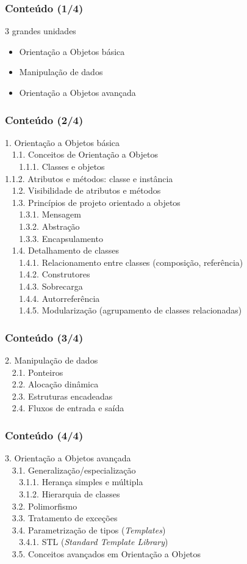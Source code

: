 \documentclass[aspectratio=169]{beamer}
\begin{document}
\begin{frame}\frametitle{Conte\'udo (1/4)}
3 grandes unidades
\begin{itemize}
	\item Orientação a Objetos básica
	\item Manipulação de dados
	\item Orientação a Objetos avançada
\end{itemize}
\end{frame}

\begin{frame}\frametitle{Conte\'udo (2/4)}
\small{1. Orientação a Objetos básica\\
~ 1.1. Conceitos de Orientação a Objetos\\
~ ~ 1.1.1. Classes e objetos\\
1.1.2. Atributos e métodos: classe e instância\\
~ 1.2. Visibilidade de atributos e métodos\\
~ 1.3. Princípios de projeto orientado a objetos\\
~ ~ 1.3.1. Mensagem\\
~ ~ 1.3.2. Abstração\\
~ ~ 1.3.3. Encapsulamento\\
~ 1.4. Detalhamento de classes\\
~ ~ 1.4.1. Relacionamento entre classes (composição, referência)\\
~ ~ 1.4.2. Construtores\\
~ ~ 1.4.3. Sobrecarga\\
~ ~ 1.4.4. Autorreferência\\
~ ~ 1.4.5. Modularização (agrupamento de classes relacionadas)}
\end{frame}

\begin{frame}\frametitle{Conte\'udo (3/4)}
2. Manipulação de dados\\
~ 2.1. Ponteiros\\
~ 2.2. Alocação dinâmica\\
~ 2.3. Estruturas encadeadas\\
~ 2.4. Fluxos de entrada e saída
\end{frame}

\begin{frame}\frametitle{Conte\'udo (4/4)}
3. Orientação a Objetos avançada\\
~ 3.1. Generalização/especialização\\
~ ~ 3.1.1. Herança simples e múltipla\\
~ ~ 3.1.2. Hierarquia de classes\\
~ 3.2. Polimorfismo\\
~ 3.3. Tratamento de exceções\\
~ 3.4. Parametrização de tipos (\emph{Templates})\\
~ ~ 3.4.1. STL (\emph{Standard Template Library})\\
~ 3.5. Conceitos avançados em Orientação a Objetos
\end{frame}
\end{document}
